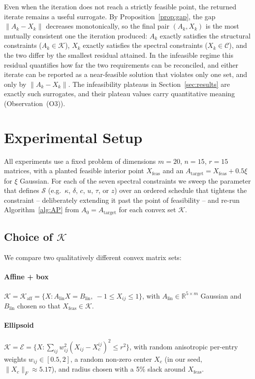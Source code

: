 \documentclass[journal]{IEEEtran}
\newcommand{\R}{\mathbb{R}}
\newcommand{\spec}{\mathcal{S}}
\newcommand{\Kset}{\mathcal{K}}
\newcommand{\Cset}{\mathcal{C}}
\newcommand{\Ellipsoid}{\mathcal{E}}
\begin{document}
Even when the iteration does not reach a strictly feasible point, the
returned iterate remains a useful surrogate. By
Proposition~\ref{prop:gap}, the gap $\|A_k - X_k\|$ decreases
monotonically, so the final pair $(A_k, X_k)$ is the most mutually
consistent one the iteration produced: $A_k$ exactly satisfies the
structural constraints ($A_k \in \Kset$), $X_k$ exactly satisfies the
spectral constraints ($X_k \in \Cset$), and the two differ by the
smallest residual attained. In the infeasible regime this residual
quantifies how far the two requirements can be reconciled, and either
iterate can be reported as a near-feasible solution that violates only
one set, and only by $\|A_k - X_k\|$. The infeasibility plateaus in
Section~\ref{sec:results} are exactly such surrogates, and their plateau
values carry quantitative meaning (Observation~(O3)).

\section{Experimental Setup}\label{sec:setup-exp}

All experiments use a fixed problem of dimensions $m=20$, $n=15$,
$r=15$ matrices, with a planted feasible interior point
$X_\mathrm{feas}$ and an $A_\mathrm{target} = X_\mathrm{feas} +
0.5 \xi$ for $\xi$ Gaussian. For each of the seven spectral
constraints we sweep the parameter that defines $\spec$ (e.g.\
$\kappa$, $\delta$, $c$, $u$, $\tau$, or $z$) over an ordered schedule
that tightens the constraint -- deliberately extending it past the
point of feasibility -- and re-run Algorithm~\ref{alg:AP} from
$A_0 = A_\mathrm{target}$ for each convex set $\Kset$.

\subsection{Choice of $\Kset$}
We compare two qualitatively different convex matrix sets:

\paragraph{Affine + box}
$\Kset = \Kset_{\mathrm{aff}} =
\{ X : A_\mathrm{lin} X = B_\mathrm{lin},\ -1 \le X_{ij} \le 1 \}$,
with $A_\mathrm{lin} \in \R^{5\times m}$ Gaussian and $B_\mathrm{lin}$
chosen so that $X_\mathrm{feas} \in \Kset$.

\paragraph{Ellipsoid}
$\Kset = \Ellipsoid =
\bigl\{ X : \sum_{ij} w_{ij}^2 (X_{ij} - X_c^{ij})^2 \le r^2 \bigr\}$,
with random anisotropic per-entry weights $w_{ij} \in [0.5,2]$, a
random non-zero center $X_c$ (in our seed,
$\|X_c\|_F \approx 5.17$), and radius chosen with a 5\% slack around
$X_\mathrm{feas}$.
\end{document}
